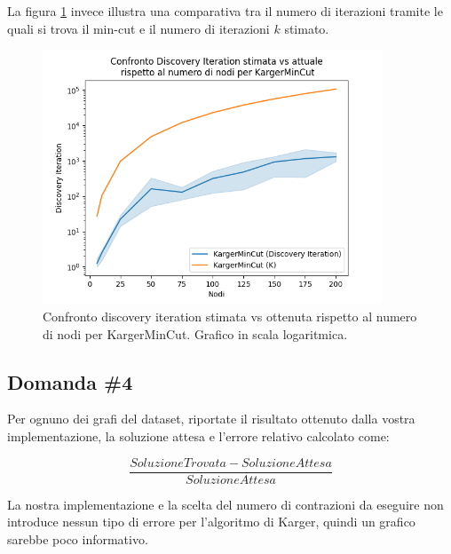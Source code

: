 \noindent La figura \ref{fig:karger-discovery-vs-estimated-k-chart} invece
illustra una comparativa tra il numero di iterazioni tramite le quali
si trova il min-cut e il numero di iterazioni $k$ stimato.

\begin{figure}[!ht]
    \centering

    \includegraphics[width=0.9\textwidth]{./images/Confronto_Discovery_Iteration_stimata_vs_attuale__rispetto_al_numero_di_nodi_per_KargerMinCut.png}

    \caption{Confronto discovery iteration stimata vs ottenuta rispetto al numero di nodi per KargerMinCut. Grafico in scala logaritmica.}
    \label{fig:karger-discovery-vs-estimated-k-chart}
\end{figure}

\subsection{Domanda \#4}
\label{sec:question-4}

\begin{displayquote}
Per ognuno dei grafi del dataset, riportate il risultato
ottenuto dalla vostra implementazione, la soluzione attesa e l'errore
relativo calcolato come:

\begin{equation*}
    \frac{SoluzioneTrovata - SoluzioneAttesa}{SoluzioneAttesa}
\end{equation*}

\end{displayquote}

\noindent La nostra implementazione e la scelta del numero di
contrazioni da eseguire non introduce nessun tipo di errore per
l'algoritmo di Karger, quindi un grafico sarebbe poco informativo.\\

